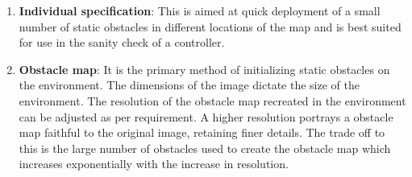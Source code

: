 \begin{enumerate}
\item \textbf{Individual specification}: This is aimed at quick deployment of  a small number of static obstacles in different locations of the map and is best suited for use in the sanity check of a controller.
\item \textbf{Obstacle map}: It is the primary method of initializing static obstacles on the environment. The dimensions of the image dictate the size of the environment. The resolution of the obstacle map recreated in the environment can be adjusted as per requirement. A higher resolution portrays a obstacle map faithful to the original image, retaining finer details. The trade off to this is the large number of obstacles used to create the obstacle map which increases exponentially with the increase in resolution.


\end{enumerate}

